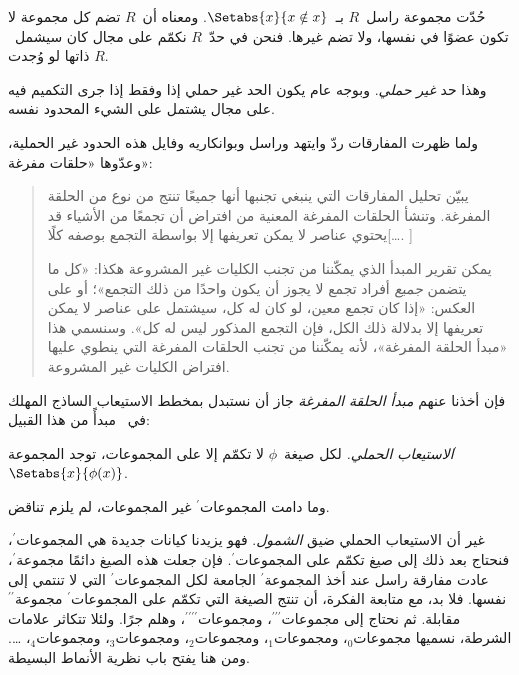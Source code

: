 \documentclass[../../../include/open-logic-section]{subfiles}
\begin{document}


حُدّت مجموعة راسل~$R$ بـ~$\Setabs{x}{x \notin x}$. ومعناه أن~$R$
تضم كل مجموعة لا تكون عضوًا في نفسها، ولا تضم غيرها. فنحن في حدّ~$R$
نكمّم على مجال كان سيشمل~$R$ ذاتها لو وُجدت.

وهذا حد \emph{غير حملي}. وبوجه عام يكون الحد غير حملي إذا وفقط إذا
جرى التكميم فيه على مجال يشتمل على الشيء المحدود نفسه.
	
ولما ظهرت المفارقات ردّ وايتهد وراسل وبوانكاريه وفايل هذه الحدود غير
الحملية، وعدّوها «حلقات مفرغة»:
\begin{quote}
	يبيّن تحليل المفارقات التي ينبغي تجنبها أنها جميعًا تنتج من نوع من
	الحلقة المفرغة. وتنشأ الحلقات المفرغة المعنية من افتراض أن تجمعًا من
	الأشياء قد يحتوي عناصر لا يمكن تعريفها إلا بواسطة التجمع بوصفه
	كلًا[\ldots. \textparagraph]

	يمكن تقرير المبدأ الذي يمكّننا من تجنب الكليات غير المشروعة هكذا:
	«كل ما يتضمن \emph{جميع} أفراد تجمع لا يجوز أن يكون واحدًا من ذلك
	التجمع»؛ أو على العكس: «إذا كان تجمع معين، لو كان له كل، سيشتمل على
	عناصر لا يمكن تعريفها إلا بدلالة ذلك الكل، فإن التجمع المذكور ليس له
	كل». وسنسمي هذا «مبدأ الحلقة المفرغة»، لأنه يمكّننا من تجنب الحلقات
	المفرغة التي ينطوي عليها افتراض الكليات غير المشروعة.
	\citep[p.~37]{WhiteheadRussell1910}
\end{quote}
فإن أخذنا عنهم \emph{مبدأ الحلقة المفرغة} جاز أن نستبدل بمخطط
الاستيعاب الساذج المهلك في~ مبدأً من
هذا القبيل:

\begin{defish}
\emph{الاستيعاب الحملي.} لكل صيغة~$\phi$ لا تكمّم إلا على المجموعات،
توجد المجموعة$^\prime$~$\Setabs{x}{\phi(x)}$.
\end{defish}

وما دامت المجموعات$^{\prime}$ غير المجموعات، لم يلزم تناقض.

غير أن الاستيعاب الحملي ضيق \emph{الشمول}. فهو يزيدنا كيانات جديدة هي
المجموعات$^\prime$، فنحتاج بعد ذلك إلى صيغ تكمّم على
المجموعات$^\prime$. فإن جعلت هذه الصيغ دائمًا مجموعة$^\prime$، عادت
مفارقة راسل عند أخذ المجموعة$^\prime$ الجامعة لكل
المجموعات$^\prime$ التي لا تنتمي إلى نفسها. فلا بد، مع متابعة الفكرة،
أن تنتج الصيغة التي تكمّم على المجموعات$^\prime$
مجموعة$^{\prime\prime}$ مقابلة. ثم نحتاج إلى
مجموعات$^{\prime\prime\prime}$، ومجموعات$^{\prime\prime\prime\prime}$،
وهلم جرًا. ولئلا تتكاثر علامات الشرطة، نسميها مجموعات$_0$،
ومجموعات$_1$، ومجموعات$_2$، ومجموعات$_3$، ومجموعات$_4$، \ldots.
ومن هنا يفتح باب نظرية الأنماط البسيطة.
\end{document}
